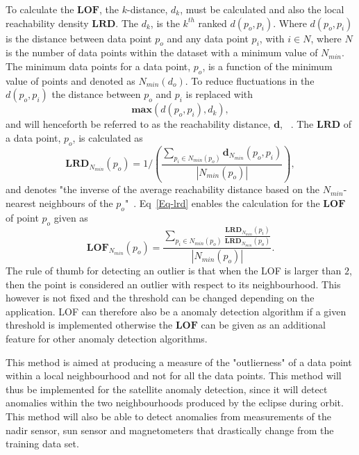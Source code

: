 To calculate the $\mathbf{LOF}$, the $k$-distance, $d_k$, must be calculated and also the local reachability density $\mathbf{LRD}$. The $d_k$, is the $k^{th}$ ranked $d(p_o,p_i)$. Where $d(p_o,p_i)$ is the distance between data point $p_o$ and any data point $p_i$, with $i \in N$, where $N$ is the number of data points within the dataset with a minimum value of $N_{min}$. The minimum data points for a data point, $p_o$, is a function of the minimum value of points and denoted as $N_{min}(d_o)$. To reduce fluctuations in the $d(p_o,p_i)$ the distance between $p_o$ and $p_i$ is replaced with 
\begin{equation}
\textbf{max} \left( d(p_o,p_i), d_k \right),
\end{equation}
and will henceforth be referred to as the reachability distance, $\mathbf{d}$, ~\cite{breunig2000lof}. The $\mathbf{LRD}$ of a data point, $p_o$, is calculated as 
\begin{equation}
\mathbf{LRD}_{N_{min}}(p_o) = 1/\left(\frac{\sum\limits_{p_i \in N_{min}(p_o)}^{} \mathbf{d}_{N_{min}}(p_o,p_i)}{\left|N_{min}(p_o) \right|}\right),
\label{Eq-lrd}
\end{equation}
and denotes "the inverse of the average reachability distance based on the $N_{min}$-nearest neighbours of the $p_o$"~\cite{breunig2000lof}. Eq~\ref{Eq-lrd} enables the calculation for the $\mathbf{LOF}$ of point $p_o$ given as
\begin{equation}
\mathbf{LOF}_{N_{min}}(p_o) = \frac{\sum\limits_{p_i \in N_{min}(p_o)}^{}\frac{\mathbf{LRD}_{N_{min}}(p_i)}{\mathbf{LRD}_{N_{min}}(p_o)}}{\left| N_{min}(p_o) \right|}.
\label{Eq-LOF}
\end{equation}
The rule of thumb for detecting an outlier is that when the LOF is larger than $2$, then the point is considered an outlier with respect to its neighbourhood. This however is not fixed and the threshold can be changed depending on the application. LOF can therefore also be a anomaly detection algorithm if a given threshold is implemented otherwise the $\mathbf{LOF}$ can be given as an additional feature for other anomaly detection algorithms.

This method is aimed at producing a measure of the "outlierness" of a data point within a local neighbourhood and not for all the data points. This method will thus be implemented for the satellite anomaly detection, since it will detect anomalies within the two neighbourhoods produced by the eclipse during orbit. This method will also be able to detect anomalies from measurements of the nadir sensor, sun sensor and magnetometers that drastically change from the training data set. 

